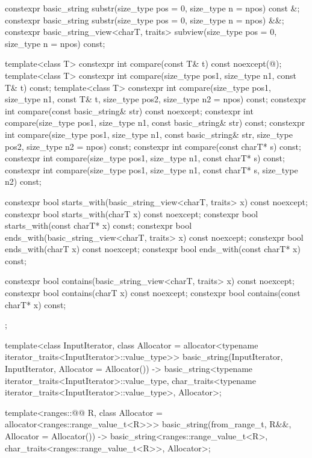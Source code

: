 \begin{codeblock}
{{    constexpr basic_string substr(size_type pos = 0, size_type n = npos) const &;
    constexpr basic_string substr(size_type pos = 0, size_type n = npos) &&;
    constexpr basic_string_view<charT, traits> subview(size_type pos = 0,
                                                       size_type n = npos) const;

    template<class T>
      constexpr int compare(const T& t) const noexcept(@\seebelow@);
    template<class T>
      constexpr int compare(size_type pos1, size_type n1, const T& t) const;
    template<class T>
      constexpr int compare(size_type pos1, size_type n1, const T& t,
                            size_type pos2, size_type n2 = npos) const;
    constexpr int compare(const basic_string& str) const noexcept;
    constexpr int compare(size_type pos1, size_type n1, const basic_string& str) const;
    constexpr int compare(size_type pos1, size_type n1, const basic_string& str,
                          size_type pos2, size_type n2 = npos) const;
    constexpr int compare(const charT* s) const;
    constexpr int compare(size_type pos1, size_type n1, const charT* s) const;
    constexpr int compare(size_type pos1, size_type n1, const charT* s, size_type n2) const;

    constexpr bool starts_with(basic_string_view<charT, traits> x) const noexcept;
    constexpr bool starts_with(charT x) const noexcept;
    constexpr bool starts_with(const charT* x) const;
    constexpr bool ends_with(basic_string_view<charT, traits> x) const noexcept;
    constexpr bool ends_with(charT x) const noexcept;
    constexpr bool ends_with(const charT* x) const;

    constexpr bool contains(basic_string_view<charT, traits> x) const noexcept;
    constexpr bool contains(charT x) const noexcept;
    constexpr bool contains(const charT* x) const;
  };

  template<class InputIterator,
           class Allocator = allocator<typename iterator_traits<InputIterator>::value_type>>
    basic_string(InputIterator, InputIterator, Allocator = Allocator())
      -> basic_string<typename iterator_traits<InputIterator>::value_type,
                      char_traits<typename iterator_traits<InputIterator>::value_type>,
                      Allocator>;

  template<ranges::@@ R,
           class Allocator = allocator<ranges::range_value_t<R>>>
    basic_string(from_range_t, R&&, Allocator = Allocator())
      -> basic_string<ranges::range_value_t<R>, char_traits<ranges::range_value_t<R>>,
                      Allocator>;

}
\end{codeblock}
